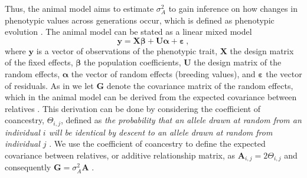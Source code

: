 Thus, the animal model aims to estimate $\sigma^2_A$ to gain inference on how changes in phenotypic values across generations occur, which is defined as phenotypic evolution \citep{ConnerHartl2004}.
The animal model can be stated as a linear mixed model
\begin{equation}
    \mathbf{y} = \mathbf{X}\boldsymbol{\beta} + \mathbf{U}\boldsymbol{\alpha} + \boldsymbol{\varepsilon} \ ,
\end{equation}
where $\mathbf{y}$ is a vector of observations of the phenotypic trait, $\mathbf{X}$ the design matrix of the fixed effects, $\boldsymbol{\beta}$ the population coefficients, $\mathbf{U}$ the design matrix of the random effects, $\boldsymbol{\alpha}$ the vector of random effects (breeding values), and $\boldsymbol{\varepsilon}$ the vector of residuals.
As in  we let $\mathbf{G}$ denote the covariance matrix of the random effects, which in the animal model can be derived from the expected covariance between relatives \citep{Kruuk2004}.
This derivation can be done by considering the coefficient of coancestry, $\Theta_{i,j}$, defined as \textit{the probability that an allele drawn at random from an individual $i$ will be identical by descent to an allele drawn at random from individual $j$} \citep{Kruuk2004}. 
We use the coefficient of coancestry to define the expected covariance between relatives, or additive relationship matrix, as $\mathbf{A}_{i, j}=2\Theta_{i, j}$ and consequently $\mathbf{G}=\sigma^2_A\mathbf{A}$ \citep{Kruuk2004}.


